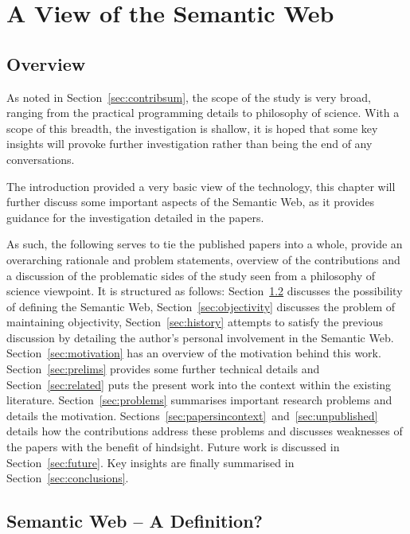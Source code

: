 \chapter{A View of the Semantic Web}

\section{Overview}\label{sec:introoverview}

As noted in Section~\ref{sec:contribsum}, the scope of the study is
very broad, ranging from the practical programming details to
philosophy of science. With a scope of this breadth, the investigation
is shallow, it is hoped that some key insights will provoke further
investigation rather than being the end of any conversations.

The introduction provided a very basic view of the technology, this
chapter will further discuss some important aspects of the Semantic
Web, as it provides guidance for the investigation detailed in the
papers.

As such, the following serves to tie the published papers into a
whole, provide an overarching rationale and problem statements,
overview of the contributions and a discussion of the problematic
sides of the study seen from a philosophy of science viewpoint. It is
structured as follows: Section~\ref{sec:nodef} discusses the
possibility of defining the Semantic Web,
Section~\ref{sec:objectivity} discusses the problem of maintaining
objectivity, Section~\ref{sec:history} attempts to satisfy the
previous discussion by detailing the author's personal involvement in
the Semantic Web. Section~\ref{sec:motivation} has an overview of the
motivation behind this work.  Section~\ref{sec:prelims} provides some
further technical details and Section~\ref{sec:related} puts the
present work into the context within the existing
literature. Section~\ref{sec:problems} summarises important research
problems and details the motivation.
Sections~\ref{sec:papersincontext}~and~\ref{sec:unpublished} details
how the contributions address these problems and discusses weaknesses
of the papers with the benefit of hindsight. Future work is discussed
in Section~\ref{sec:future}. Key insights are finally summarised in
Section~\ref{sec:conclusions}.


\section{Semantic Web -- A Definition?}\label{sec:nodef}

